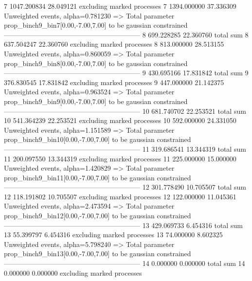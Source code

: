 7          1047.200834     28.049121       excluding marked processes    
7          1394.000000     37.336309       Unweighted events, alpha=0.781230
  => Total parameter prop_binch9_bin7[0.00,-7.00,7.00] to be gaussian constrained
------------------------------------------------------------
8          699.228285      22.360760       total sum                     
8          637.504247      22.360760       excluding marked processes    
8          813.000000      28.513155       Unweighted events, alpha=0.860059
  => Total parameter prop_binch9_bin8[0.00,-7.00,7.00] to be gaussian constrained
------------------------------------------------------------
9          430.695166      17.831842       total sum                     
9          376.830545      17.831842       excluding marked processes    
9          447.000000      21.142375       Unweighted events, alpha=0.963524
  => Total parameter prop_binch9_bin9[0.00,-7.00,7.00] to be gaussian constrained
------------------------------------------------------------
10         681.740702      22.253521       total sum                     
10         541.364239      22.253521       excluding marked processes    
10         592.000000      24.331050       Unweighted events, alpha=1.151589
  => Total parameter prop_binch9_bin10[0.00,-7.00,7.00] to be gaussian constrained
------------------------------------------------------------
11         319.686541      13.344319       total sum                     
11         200.097550      13.344319       excluding marked processes    
11         225.000000      15.000000       Unweighted events, alpha=1.420829
  => Total parameter prop_binch9_bin11[0.00,-7.00,7.00] to be gaussian constrained
------------------------------------------------------------
12         301.778490      10.705507       total sum                     
12         118.191802      10.705507       excluding marked processes    
12         122.000000      11.045361       Unweighted events, alpha=2.473594
  => Total parameter prop_binch9_bin12[0.00,-7.00,7.00] to be gaussian constrained
------------------------------------------------------------
13         429.069733      6.454316        total sum                     
13         55.399797       6.454316        excluding marked processes    
13         74.000000       8.602325        Unweighted events, alpha=5.798240
  => Total parameter prop_binch9_bin13[0.00,-7.00,7.00] to be gaussian constrained
------------------------------------------------------------
14         0.000000        0.000000        total sum                     
14         0.000000        0.000000        excluding marked processes    

